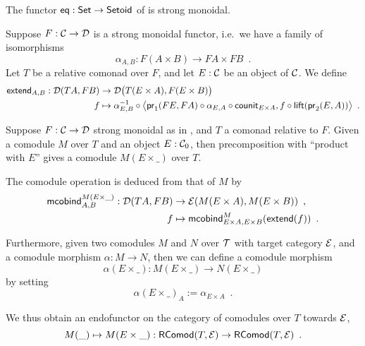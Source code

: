 \documentclass{amsart}
\begin{document}
\begin{example}
  The functor $\eq: \Set \to \Setoid$ of  is strong monoidal.
\end{example}


\begin{definition}\label{def:extend}
 Suppose $F : \C\to \D$ is a strong monoidal functor, i.e.\ we have a family of isomorphisms
  \[ \alpha_{A,B} : F(A\times B) \to FA\times FB\enspace . \] 
  Let $T$ be a relative comonad over $F$, and let $E : \C$ be an object of $\C$.
 We define
 \begin{align*} \extend_{A,B} : \D(TA,FB) &\to \D\bigl(T(E\times A),F(E\times B)\bigr)\\
                                   f   &\mapsto \comp{\bigl\langle \comp{\counit_{E\times A}}{\comp{\alpha_{E,A}}{\pr_1(FE,FA)}}, \comp{\lift(\pr_2(E,A))}{f} \bigr\rangle}{\alpha_{E,B}^{-1}} \enspace .
\end{align*}



\end{definition}



\begin{definition}\label{def:product_in_context}
 Suppose $F:\C\to\D$ strong monoidal as in , and $T$ a comonad relative to $F$.
 Given a comodule $M$ over $T$ and an object $E:\C_0$, then precomposition with \enquote{product with $E$}
 gives a comodule $M(E\times\_)$ over $T$.
 
 The comodule operation is deduced from that of $M$ by 
 \begin{align*} \mcobind^{M(E\times\_)}_{A,B} : \D(TA,FB)&\to \E(M(E\times A), M(E\times B)) \enspace ,\\
                                                      f &\mapsto \mcobind^M_{E\times A,E\times B}(\extend(f)) \enspace .
  \end{align*}                                        

 \noindent
 Furthermore, given two comodules $M$ and $N$ over $\T$ with target category $\E$, and a comodule morphism $\alpha : M \to N$, then 
 we can define a comodule morphism \[\alpha(E\times \_) : M(E\times \_) \to N(E\times \_) \] by setting
          \[ \alpha(E \times \_)_A := \alpha_{E\times A} \enspace . \]
  
  \noindent
  We thus obtain an endofunctor on the category of comodules over $T$ towards $\E$,
   \[ M(\_) \mapsto  M (E\times \_) : \RComod(T,\E) \to \RComod(T,\E) \enspace . \]
 

\end{definition}
\end{document}
